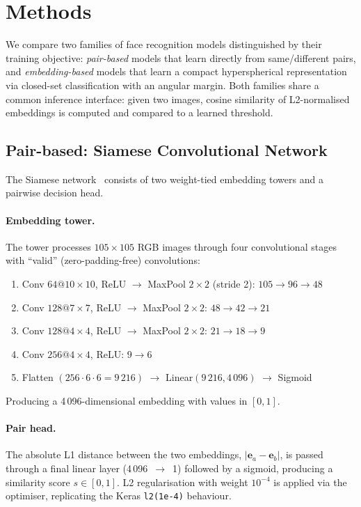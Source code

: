 \section{Methods}
\label{sec:methods}

We compare two families of face recognition models distinguished by their training
objective: \emph{pair-based} models that learn directly from same/different pairs, and
\emph{embedding-based} models that learn a compact hyperspherical representation via
closed-set classification with an angular margin.  Both families share a common inference
interface: given two images, cosine similarity of L2-normalised embeddings is computed and
compared to a learned threshold.

\subsection{Pair-based: Siamese Convolutional Network}

The Siamese network~\cite{bromley1994signature, koch2015siamese} consists of two weight-tied
embedding towers and a pairwise decision head.

\paragraph{Embedding tower.}
The tower processes $105\!\times\!105$ RGB images through four convolutional stages with
``valid'' (zero-padding-free) convolutions:
\begin{enumerate}[leftmargin=1.5em, itemsep=1pt, parsep=0pt]
  \item Conv $64 @ 10{\times}10$, ReLU $\rightarrow$ MaxPool $2{\times}2$ (stride 2):
        $105\!\to\!96\!\to\!48$
  \item Conv $128 @ 7{\times}7$, ReLU $\rightarrow$ MaxPool $2{\times}2$:
        $48\!\to\!42\!\to\!21$
  \item Conv $128 @ 4{\times}4$, ReLU $\rightarrow$ MaxPool $2{\times}2$:
        $21\!\to\!18\!\to\!9$
  \item Conv $256 @ 4{\times}4$, ReLU: $9\!\to\!6$
  \item Flatten $(256 \cdot 6 \cdot 6 = 9\,216)$ $\rightarrow$ Linear$(9\,216, 4\,096)$ $\rightarrow$ Sigmoid
\end{enumerate}
Producing a 4\,096-dimensional embedding with values in $[0, 1]$.

\paragraph{Pair head.}
The absolute L1 distance between the two embeddings, $|\mathbf{e}_a - \mathbf{e}_b|$, is
passed through a final linear layer (4\,096~$\to$~1) followed by a sigmoid, producing a
similarity score $s \in [0, 1]$.  L2 regularisation with weight $10^{-4}$ is applied via
the optimiser, replicating the Keras \texttt{l2(1e-4)} behaviour.

